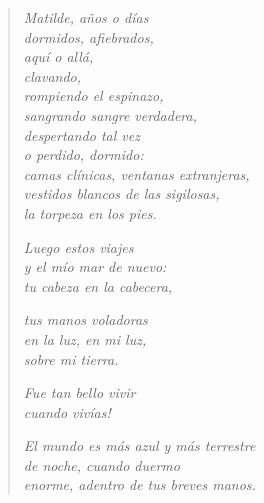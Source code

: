\documentclass[12pt]{article}
\begin{document}
\clearpage
{}
\begin{verse}

\emph{Matilde, años o días\\
dormidos, afiebrados,\\
aquí o allá,\\
clavando,\\
rompiendo el espinazo,\\
sangrando sangre verdadera,\\
despertando tal vez\\
o perdido, dormido:\\
camas clínicas, ventanas extranjeras,\\
vestidos blancos de las sigilosas,\\
la torpeza en los pies.}  

\emph{Luego estos viajes\\
y el mío mar de nuevo:\\
tu cabeza en la cabecera,}  

\emph{tus manos voladoras\\
en la luz, en mi luz,\\
sobre mi tierra.}  

\emph{Fue tan bello vivir\\
cuando vivías!}  

\emph{El mundo es más azul y más terrestre\\
de noche, cuando duermo\\
enorme, adentro de tus breves manos.}
\end{verse}
\end{document}
